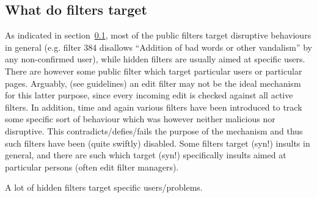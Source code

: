 \subsection{What do filters target}

As indicated in section~\ref{}, most of the public filters target disruptive behaviours in general (e.g. filter 384 disallows ``Addition of bad words or other vandalism'' by any non-confirmed user), while hidden filters are usually aimed at specific users.
There are however some public filter which target particular users or particular pages.
Arguably, (see guidelines) an edit filter may not be the ideal mechanism for this latter purpose, since every incoming edit is checked against all active filters.
In addition, time and again various filters have been introduced to track some specific sort of behaviour which was however neither malicious nor disruptive.
This contradicts/defies/fails the purpose of the mechanism and thus such filters have been (quite swiftly) disabled.
Some filters target (syn!) insults in general, and there are such which target (syn!) specifically insults aimed at particular persons (often edit filter managers).

A lot of hidden filters target specific users/problems.

